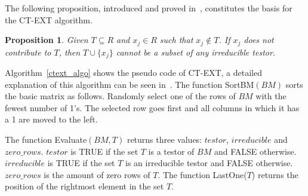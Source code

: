 \documentclass[authoryear,preprint,review,12pt]{elsarticle}
\newtheorem{proposition}{Proposition}
\begin{document}
The following proposition, introduced and proved in~\citep{R22}, constitutes the basis for the CT-EXT algorithm.

\begin{proposition}\label{prop1} Given $T \subseteq R$ and $x_j \in R$ such that $x_j \notin T$. If $x_j$ does not contribute to $T$, then $T\cup\{x_j\}$ cannot be a subset of any irreducible testor.
\end{proposition}



Algorithm~\ref{ctext_algo} shows the pseudo code of CT-EXT, a detailed explanation of
this algorithm can be seen in~\citep{R22}. The function SortBM$(BM)$ sorts the basic matrix as follows.
Randomly select one of the rows of $BM$ with the fewest number of 1's. The selected row goes first and
all columns in which it has a 1 are moved to the left.

The function Evaluate$(BM,T)$ returns three values: $testor$, $irreducible$ and $zero\_rows$. $testor$ is TRUE if the set $T$ is a testor of $BM$ and FALSE otherwise. $irreducible$ is TRUE if the set $T$ is an irreducible testor and FALSE otherwise. $zero\_rows$ is the amount of zero rows of $T$. The function LastOne($T$) returns the
position of the rightmost element in the set $T$.
\end{document}
